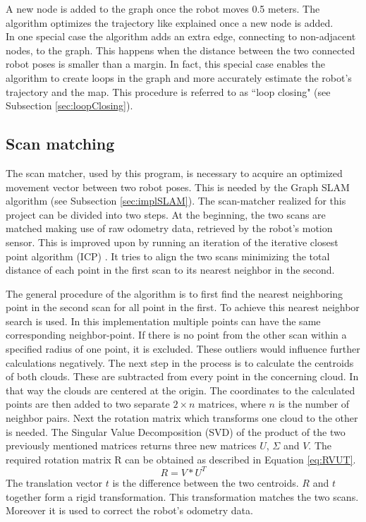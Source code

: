 \documentclass{ba-kecs}
\begin{document}
A new node is added to the graph once the robot moves 0.5 meters. The algorithm optimizes the trajectory like explained once a new node is added.\\
In one special case the algorithm adds an extra edge, connecting to non-adjacent nodes, to the graph. This happens when the distance between the two connected robot poses is smaller than a margin. In fact, this special case enables the algorithm to create loops in the graph and more accurately estimate the robot's trajectory and the map. This procedure is referred to as ``loop closing" (see Subsection \ref{sec:loopClosing}). 
\subsection{Scan matching}
\label{sec:scan}
The scan matcher, used by this program, is necessary to acquire an optimized movement vector between two robot poses. This is needed by the Graph SLAM algorithm (see Subsection \ref{sec:implSLAM}). The scan-matcher realized for this project can be divided into two steps. At the beginning, the two scans are matched making use of raw odometry data, retrieved by the robot's motion sensor. This is improved upon by running an iteration of the iterative closest point algorithm (ICP) \citep{scanmatch}. It tries to align the two scans minimizing the total distance of each point in the first scan to its nearest neighbor in the second. 

The general procedure of the algorithm \citep{scanmatch} is to first find the nearest neighboring point in the second scan for all point in the first. To achieve this nearest neighbor search is used.
In this implementation multiple points can have the same corresponding neighbor-point. If there is no point from the other scan within a specified radius of one point, it is excluded. These outliers would influence further calculations negatively.
The next step in the process is to calculate the centroids of both clouds. These are subtracted from every point in the concerning cloud. In that way the clouds are centered at the origin. The coordinates to the calculated points are then added to two separate $2 \times n$ matrices, where $n$ is the number of neighbor pairs. Next the rotation matrix which transforms one cloud to the other is needed. The Singular Value Decomposition (SVD) of the product of the two previously mentioned matrices returns three new matrices $U$, $\Sigma$ and $V$. The required rotation matrix R can be obtained as described in Equation \ref{eq:RVUT}.
\begin{equation}
\label{eq:RVUT}
 R = V * U^T
\end{equation}
The translation vector $t$ is the difference between the two centroids. $R$ and $t$ together form a rigid transformation. This transformation matches the two scans. Moreover it is used to correct the robot's odometry data.
\end{document}
